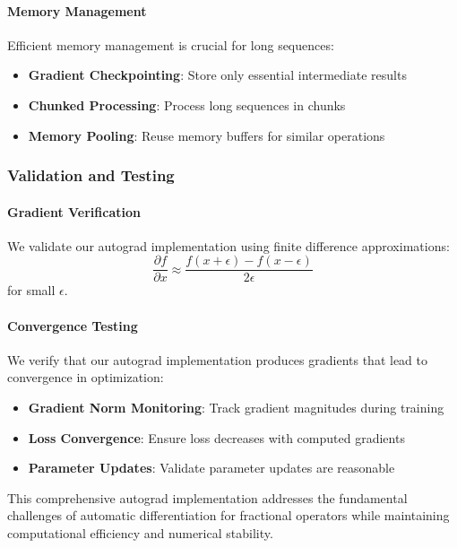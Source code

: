 \paragraph{Memory Management}

Efficient memory management is crucial for long sequences:
\begin{itemize}
\item \textbf{Gradient Checkpointing}: Store only essential intermediate results
\item \textbf{Chunked Processing}: Process long sequences in chunks
\item \textbf{Memory Pooling}: Reuse memory buffers for similar operations
\end{itemize}

\subsubsection{Validation and Testing}

\paragraph{Gradient Verification}

We validate our autograd implementation using finite difference approximations:
\begin{equation}
\frac{\partial f}{\partial x} \approx \frac{f(x + \epsilon) - f(x - \epsilon)}{2\epsilon}
\end{equation}
for small $\epsilon$.

\paragraph{Convergence Testing}

We verify that our autograd implementation produces gradients that lead to convergence in optimization:
\begin{itemize}
\item \textbf{Gradient Norm Monitoring}: Track gradient magnitudes during training
\item \textbf{Loss Convergence}: Ensure loss decreases with computed gradients
\item \textbf{Parameter Updates}: Validate parameter updates are reasonable
\end{itemize}

This comprehensive autograd implementation addresses the fundamental challenges of automatic differentiation for fractional operators while maintaining computational efficiency and numerical stability.

